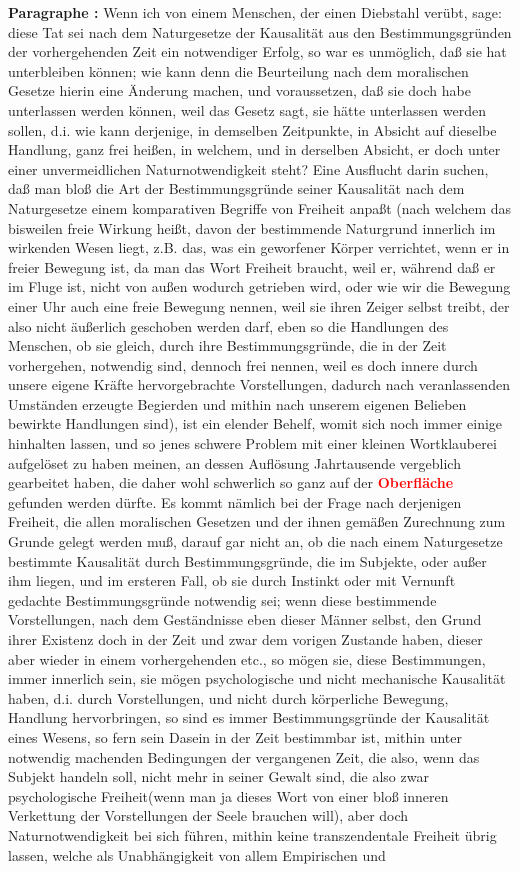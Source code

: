 \documentclass[a4paper,12pt,twoside]{book}
\newcommand{\match}[1]{\textcolor{red}{\textbf{#1}}}
\begin{document}
	\noindent\textbf{Paragraphe : }Wenn ich von einem Menschen, der einen Diebstahl verübt, sage: diese Tat sei nach dem Naturgesetze der Kausalität aus den Bestimmungsgründen der vorhergehenden Zeit ein notwendiger Erfolg, so war es unmöglich, daß sie hat unterbleiben können; wie kann denn die Beurteilung nach dem moralischen Gesetze hierin eine Änderung machen, und voraussetzen, daß sie doch habe unterlassen werden können, weil das Gesetz sagt, sie hätte unterlassen werden sollen, d.i. wie kann derjenige, in demselben Zeitpunkte, in Absicht auf dieselbe Handlung, ganz frei heißen, in welchem, und in  derselben Absicht, er doch unter einer unvermeidlichen Naturnotwendigkeit steht? Eine Ausflucht darin suchen, daß man bloß die Art der Bestimmungsgründe seiner Kausalität nach dem Naturgesetze einem komparativen Begriffe von Freiheit anpaßt (nach welchem das bisweilen freie Wirkung heißt, davon der bestimmende Naturgrund innerlich im wirkenden Wesen liegt, z.B. das, was ein geworfener Körper verrichtet, wenn er in freier Bewegung ist, da man das Wort Freiheit braucht, weil er, während daß er im Fluge ist, nicht von außen wodurch getrieben wird, oder wie wir die Bewegung einer Uhr auch eine freie Bewegung nennen, weil sie ihren Zeiger selbst treibt, der also nicht äußerlich geschoben werden darf, eben so die Handlungen des Menschen, ob sie gleich, durch ihre Bestimmungsgründe, die in der Zeit vorhergehen, notwendig sind, dennoch frei nennen, weil es doch innere durch unsere eigene Kräfte hervorgebrachte Vorstellungen, dadurch nach veranlassenden Umständen erzeugte Begierden und mithin nach unserem eigenen Belieben bewirkte Handlungen sind), ist ein elender Behelf, womit sich noch immer einige hinhalten lassen, und so jenes schwere Problem mit einer kleinen Wortklauberei aufgelöset zu haben meinen, an dessen Auflösung Jahrtausende vergeblich gearbeitet haben, die daher wohl schwerlich so ganz auf der \match{Oberfläche} gefunden werden dürfte. Es kommt nämlich bei der Frage nach derjenigen Freiheit, die allen moralischen Gesetzen und der ihnen gemäßen Zurechnung zum Grunde gelegt werden muß, darauf gar nicht an, ob die nach einem Naturgesetze bestimmte Kausalität durch Bestimmungsgründe, die im Subjekte, oder außer ihm liegen, und im ersteren Fall, ob sie durch Instinkt oder mit Vernunft gedachte Bestimmungsgründe notwendig sei; wenn diese bestimmende Vorstellungen, nach dem Geständnisse eben dieser Männer selbst, den Grund ihrer Existenz doch in der Zeit und zwar dem vorigen Zustande haben, dieser aber wieder in einem vorhergehenden etc., so mögen sie, diese Bestimmungen, immer innerlich sein, sie mögen psychologische und nicht mechanische Kausalität haben, d.i. durch Vorstellungen, und nicht durch körperliche Bewegung,  Handlung hervorbringen, so sind es immer Bestimmungsgründe der Kausalität eines Wesens, so fern sein Dasein in der Zeit bestimmbar ist, mithin unter notwendig machenden Bedingungen der vergangenen Zeit, die also, wenn das Subjekt handeln soll, nicht mehr in seiner Gewalt sind, die also zwar psychologische Freiheit(wenn man ja dieses Wort von einer bloß inneren Verkettung der Vorstellungen der Seele brauchen will), aber doch Naturnotwendigkeit bei sich führen, mithin keine transzendentale Freiheit übrig lassen, welche als Unabhängigkeit von allem Empirischen und 
\end{document}
